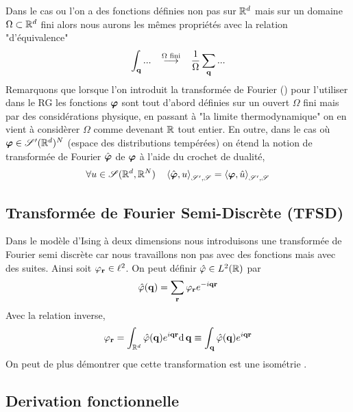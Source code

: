 \documentclass[10.5pt]{article}
\begin{document}
\begin{multicols}{2}
Dans le cas ou l'on a des fonctions définies non pas sur $\mathbb{R}^d$ mais sur un domaine $\Omega \subset \mathbb{R}^d$ fini alors nous aurons les mêmes propriétés avec la relation "d'équivalence"  
\begin{equation}
	 \int_{{\bf q}} ... \overset{\text{$\Omega$ fini}}{\quad \longrightarrow \quad } \frac{1}{\Omega} \sum_{{\bf q}} ...
\end{equation}
Remarquons que lorsque l'on introduit la transformée de Fourier () pour l'utiliser dans le RG les fonctions $\boldsymbol{ \varphi}$ sont tout d'abord définies sur un ouvert $\Omega$ fini mais par des considérations physique, en passant à "la limite thermodynamique" on en vient à considèrer $\Omega$ comme devenant $\mathbb{R}$ tout entier. En outre, dans le cas où $\boldsymbol{ \varphi} \in \mathscr{S}'(\mathbb{R}^d)^N$ (espace des distributions tempérées) on étend la notion de transformée de Fourier $\hat{\boldsymbol{ \varphi}}$ de $\boldsymbol{ \varphi}$ à l'aide du crochet de dualité, 
\begin{equation}
  \forall u \in \mathscr{S}(\mathbb{R}^d, \mathbb{R}^N) \quad \left< \hat{\boldsymbol{ \varphi}}, u \right>_{\mathscr{S}', \mathscr{S}} = \left< \boldsymbol{ \varphi}, \hat{u} \right>_{\mathscr{S}', \mathscr{S}}
\end{equation}

\vspace*{11pt}



\subsection{Transformée de Fourier Semi-Discrète (TFSD)}

\label{ann:TFSD}

Dans le modèle d'Ising à deux dimensions nous introduisons une transformée de Fourier semi discrète car nous travaillons non pas avec des fonctions mais avec des suites. Ainsi soit $\varphi_{\bf r} \in \ell^2$. On peut définir $\hat{\varphi} \in L^2(\mathbb{R})$ par  
\begin{equation}
  \hat{\varphi}({\bf q}) = \sum_{\bf r} \varphi_{\bf r} e^{-i{\bf q}{\bf r}}
\end{equation}
  Avec la relation inverse,
\begin{equation}
 \varphi_{\bf r} = \int_{\mathbb{R}^d} \hat{\varphi}({\bf q})  e^{i{\bf q}{\bf r}} \text{d}\, {\bf q} \equiv \int_{\bf q} \hat{\varphi}({\bf q})  e^{i{\bf q}{\bf r}}
\end{equation}
On peut de plus démontrer que cette transformation est une isométrie \cite{}.



\vspace*{11pt}
\subsection{Derivation fonctionnelle}


\end{multicols}
\end{document}
